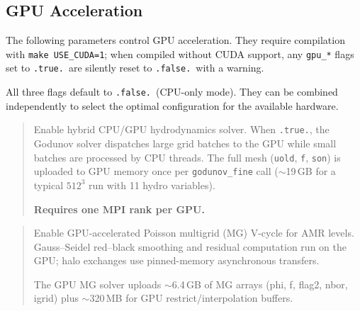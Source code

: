 \subsection{GPU Acceleration}

The following parameters control GPU acceleration.  They require
compilation with \texttt{make USE\_CUDA=1}; when compiled without CUDA
support, any \texttt{gpu\_*} flags set to \texttt{.true.}\ are
silently reset to \texttt{.false.}\ with a warning.

All three flags default to \texttt{.false.}\ (CPU-only mode).  They
can be combined independently to select the optimal configuration for
the available hardware.

\label{param:gpu_hydro}

\begin{quote}
Enable hybrid CPU/GPU hydrodynamics solver.  When \texttt{.true.}, the
Godunov solver dispatches large grid batches to the GPU while small
batches are processed by CPU threads.  The full mesh
(\texttt{uold}, \texttt{f}, \texttt{son}) is uploaded to GPU memory
once per \texttt{godunov\_fine} call ($\sim$19\,GB for a typical
$512^3$ run with 11 hydro variables).

\textbf{Requires one MPI rank per GPU.}

\end{quote}

\label{param:gpu_poisson}

\begin{quote}
Enable GPU-accelerated Poisson multigrid (MG) V-cycle for AMR levels.
Gauss--Seidel red--black smoothing and residual computation run on the
GPU; halo exchanges use pinned-memory asynchronous transfers.

The GPU MG solver uploads $\sim$6.4\,GB of MG arrays (phi, f, flag2,
nbor, igrid) plus $\sim$320\,MB for GPU restrict/interpolation
buffers.

\end{quote}

